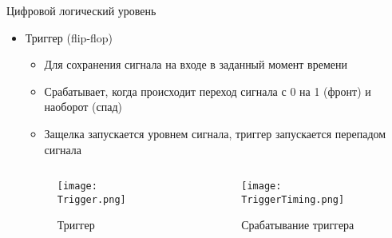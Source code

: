 \documentclass[aspectratio=169,14pt]{beamer}
\begin{document}
\begin{frame}{Цифровой логический уровень}
    \begin{itemize}
        \item Триггер (flip-flop)
        \begin{itemize}
            \item Для сохранения сигнала на входе в заданный момент времени
            \item Срабатывает, когда происходит переход сигнала с 0 на 1 (фронт)
            и наоборот (спад)
            \item Защелка запускается уровнем сигнала, триггер запускается
            перепадом сигнала
        \end{itemize}
        \begin{columns}[T,onlytextwidth]
            \begin{column}{0.4\textwidth}
                \begin{figure}[htp]
                    \centering
                    \texttt{[image: Trigger.png]}
                    \caption{\tiny{Триггер}}
                \end{figure}
            \end{column}
            \begin{column}{0.6\textwidth}
                \begin{figure}[htp]
                    \centering
                    \texttt{[image: TriggerTiming.png]}
                    \caption{\tiny{Срабатывание триггера}}
                \end{figure}
            \end{column}
        \end{columns}
    \end{itemize}
\end{frame}
\end{document}
